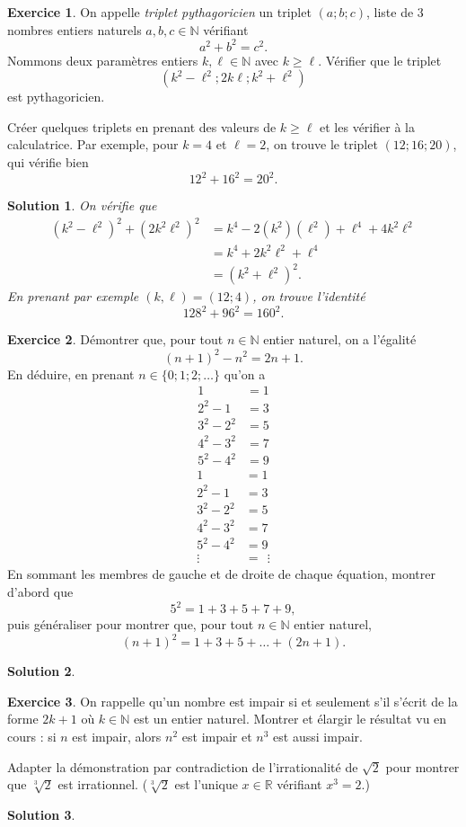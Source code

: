 \documentclass[a4paper, 14pt]{extarticle}
\theoremstyle{plain}
\newtheorem*{sol}{Solution}
\theoremstyle{definition}
\newtheorem{ex}{Exercice}
\newcommand{\R}{\mathbb{R}}
\newcommand{\N}{\mathbb{N}}
\newcommand{\exe}[2]{
		\begin{ex} #1  \end{ex}
		\begin{sol} #2 \end{sol}
	}
\newcommand{\exe}[2]{
		\begin{ex} #1  \end{ex}
	}
\begin{document}
	\exe{
		On appelle \emph{triplet pythagoricien} un triplet $(a ; b ; c)$, liste de $3$ nombres entiers naturels $a,b,c\in\N$ vérifiant
			\[ a^2 + b^2 = c^2. \]
		Nommons deux paramètres entiers $k,\ell\in\N$ avec $k\geq \ell$.
		Vérifier que le triplet
			\[ (k^2 - \ell^2 ; 2k\ell ; k^2 + \ell^2) \]
		est pythagoricien.
		
		Créer quelques triplets en prenant des valeurs de $k \geq \ell$ et les vérifier à la calculatrice.
		Par exemple, pour $k=4$ et $\ell=2$, on trouve le triplet $(12 ; 16 ; 20)$, qui vérifie bien
			\[ 12^2 + 16^2 = 20^2. \] 
	}{
	
	On vérifie que
		\begin{align*}
			(k^2 - \ell^2)^2 + (2k^2\ell^2)^2 &= k^4 - 2(k^2)(\ell^2) + \ell^4 + 4k^2\ell^2 \\
											&= k^4 + 2k^2\ell^2 + \ell^4 \\
											&= (k^2 + \ell^2)^2.
		\end{align*}
	En prenant par exemple $(k, \ell) = (12; 4)$, on trouve l'identité
		\[ 128^2 + 96^2 = 160^2. \]
	
	}
	
	\exe{
		Démontrer que, pour tout $n\in\N$ entier naturel, on a l'égalité
			\[ (n+1)^2 -n^2 = 2n+1. \]
		En déduire, en prenant $n\in\{0;1;2; \dots\}$ qu'on a
		\ifdys
			\begin{align*}
				1 &= 1 \\
				2^2 - 1 &= 3 \\
				3^2 - 2^2 &= 5 \\
				4^2 - 3^2 &= 7 \\
				5^2 - 4^2 &= 9
			\end{align*}
		\else
			\begin{align*}
				1 &= 1 \\
				2^2 - 1 &= 3 \\
				3^2 - 2^2 &= 5 \\
				4^2 - 3^2 &= 7 \\
				5^2 - 4^2 &= 9 \\
				\vdots\quad \, &= \ \ \vdots
			\end{align*}
		\fi
		En sommant les membres de gauche et de droite de chaque équation, montrer d'abord que
			\[ 5^2 = 1 + 3 + 5 + 7 + 9, \]
		puis généraliser pour montrer que, pour tout $n\in\N$ entier naturel,
			\[ (n+1)^2 = 1 + 3 + 5 + \dots + (2n+1). \]
	}{}
	
	\exe{
		On rappelle qu'un nombre est impair si et seulement s'il s'écrit de la forme $2k+1$ où $k\in\N$ est un entier naturel.
		Montrer et élargir le résultat vu en cours : si $n$ est impair, alors $n^2$ est impair et $n^3$ est aussi impair.
		
		Adapter la démonstration par contradiction de l’irrationalité de $\sqrt{2}$ pour montrer que $\sqrt[3]{2}$ est irrationnel. ($\sqrt[3]{2}$ est l'unique $x\in\R$ vérifiant $x^3 = 2$.)
	}{}
\end{document}
